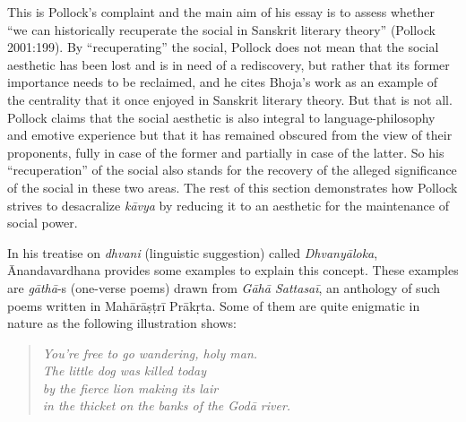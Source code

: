 This is Pollock's complaint and the main aim of his essay is to assess whether ``we can historically recuperate the social in Sanskrit literary theory'' (Pollock 2001:199). By ``recuperating'' the social, Pollock does not mean that the social aesthetic has been lost and is in need of a rediscovery, but rather that its former importance needs to be reclaimed, and he cites Bhoja's work as an example of the centrality that it once enjoyed in Sanskrit literary theory. But that is not all. Pollock claims that the social aesthetic is also integral to language-philosophy and emotive experience but that it has remained obscured from the view of their proponents, fully in case of the former and partially in case of the latter. So his ``recuperation'' of the social also stands for the recovery of the alleged significance of the social in these two areas. The rest of this section demonstrates how Pollock strives to desacralize \textsl{kāvya} by reducing it to an aesthetic for the maintenance of social power.

In his treatise on \textsl{dhvani} (linguistic suggestion) called \textsl{Dhvanyāloka}, Ānandavardhana provides some examples to explain this concept. These examples are \textsl{gāthā}-s (one-verse poems) drawn from \textsl{Gāhā Sattasaī}, an anthology of such poems written in Mahārāṣṭrī Prākṛta. Some of them are quite enigmatic in nature as the following illustration shows:\\[-15pt]
\begin{quote}
\textsl{You’re free to go wandering, holy man.}\\
\textsl{The little dog was killed today}\\
\textsl{by the fierce lion making its lair}\\
\textsl{in the thicket on the banks of the Godā river.}
\end{quote}
\vskip -5pt

